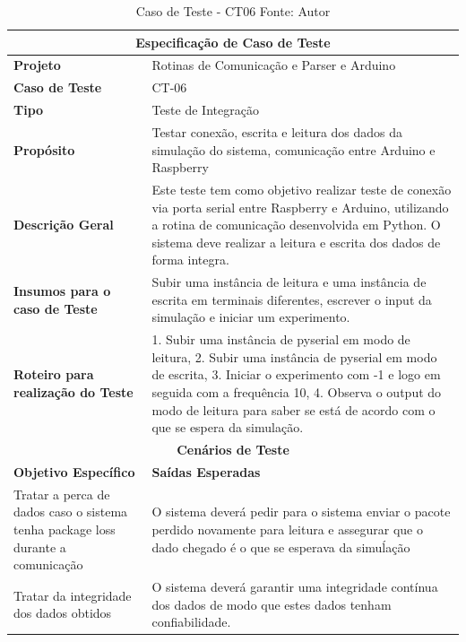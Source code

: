 \begin{table}[H]
    \begin{center}
        \begin{tabular}{|p{5cm}|p{12cm}|}
            \hline
            \multicolumn{2}{|c|}{\textbf{Especificação de Caso de Teste}} \\ \hline
                \textbf{Projeto}                                        & Rotinas de Comunicação e Parser e Arduino\\ \hline
                \textbf{Caso de Teste}                             & CT-06 \\ \hline
                \textbf{Tipo}                                             & Teste de Integração \\ \hline
                \textbf{Propósito}                                     & Testar conexão, escrita e leitura dos dados da simulação do sistema, comunicação entre Arduino e Raspberry \\ \hline
                \textbf{Descrição Geral}                           & Este teste tem como objetivo realizar teste de conexão via porta serial entre Raspberry e Arduino, utilizando a rotina de comunicação desenvolvida em Python. O sistema deve realizar a leitura e escrita dos dados de forma integra. \\ \hline
                \textbf{Insumos para o caso de Teste}    & Subir uma instância de leitura e uma instância de escrita em terminais diferentes, escrever o input da simulação e iniciar um experimento. \\ \hline
                \textbf{Roteiro para realização do Teste}&  1. Subir uma instância de pyserial em modo de leitura, 2. Subir uma instância de pyserial em modo de escrita, 3. Iniciar o experimento com -1 e logo em seguida com a frequência 10, 4. Observa o output do modo de leitura para saber se está de acordo com o que se espera da simulação. \\ \hline
            \multicolumn{2}{|c|}{\textbf{Cenários de Teste}} \\ \hline
                \textbf{Objetivo Específico}                      & \textbf{Saídas Esperadas} \\ \hline
                Tratar a perca de dados caso o sistema tenha package loss durante a comunicação & O sistema deverá pedir para o sistema enviar o pacote perdido novamente para leitura e assegurar que o dado chegado é o que se esperava da simuĺação \\ \hline
                Tratar da integridade dos dados obtidos  & O sistema deverá garantir uma integridade contínua dos dados de modo que estes dados tenham confiabilidade. \\ \hline
        \end{tabular}
    \end{center}
    \caption[Caso de Teste - CT06]{Caso de Teste - CT06
    \protect Fonte: Autor}
    \label{CT-06}
\end{table}

